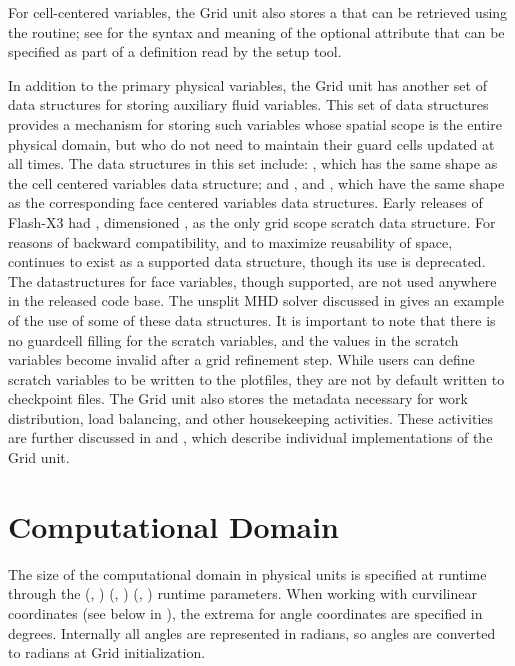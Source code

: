 For cell-centered variables, the \unit{Grid} unit
also stores a  that can be retrieved using 
the  routine; see
 for the syntax and meaning
of the optional  attribute that can be specified
as part of a  definition read by the setup tool.

In addition to the primary physical variables, the \unit{Grid} unit has
another set of data structures for storing auxiliary fluid variables. 
This set of data structures provides a mechanism for storing such
variables whose spatial scope is the entire 
physical domain, but who do not need to maintain their guard cells
updated at all times. The data structures in this set include:
, which has the same shape as the cell
centered variables data structure;  and ,
 and , which have
the same shape as the corresponding face centered variables
data structures. Early releases of Flash-X3 had ,
dimensioned
, as  
the only grid scope scratch data structure.  For reasons of backward
compatibility, and to maximize reusability of space, 
continues to exist as a supported data structure, though its use is
deprecated.  The
datastructures  
for face variables, though supported, are not used anywhere in the
released code base.  The unsplit MHD solver
 discussed in  gives an
example of the use of some of these data structures. It is important
to note that there is no guardcell filling for the scratch variables,
and the values in the scratch variables become invalid after a grid
refinement step. While users can define scratch variables to be
written to the plotfiles, they are not by default written to 
checkpoint files. The \unit{Grid} unit also stores the metadata
necessary for work distribution, load balancing, and other
housekeeping activities. These activities are further discussed in 
 and , which describe
individual implementations of the \unit{Grid} unit.


\section{Computational Domain}
\label{Sec:computational domain}
The size of the computational domain%
in
physical units is specified at runtime through the
(, )%
(, )%
(, )%
runtime parameters.
When working with curvilinear coordinates (see
below in ), the extrema for angle
coordinates%
are specified in
degrees. Internally all angles are represented in radians, so angles
are converted to radians at \unit{Grid} initialization. 

